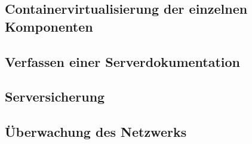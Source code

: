 \hypertarget{containervirtualisierung-der-einzelnen-komponenten}{%
\subsection{Containervirtualisierung der einzelnen
Komponenten}\label{containervirtualisierung-der-einzelnen-komponenten}}

\hypertarget{verfassen-einer-serverdokumentation}{%
\subsection{Verfassen einer
Serverdokumentation}\label{verfassen-einer-serverdokumentation}}

\hypertarget{serversicherung}{%
\subsection{Serversicherung}\label{serversicherung}}

\hypertarget{uxfcberwachung-des-netzwerks}{%
\subsection{Überwachung des
Netzwerks}\label{uxfcberwachung-des-netzwerks}}
